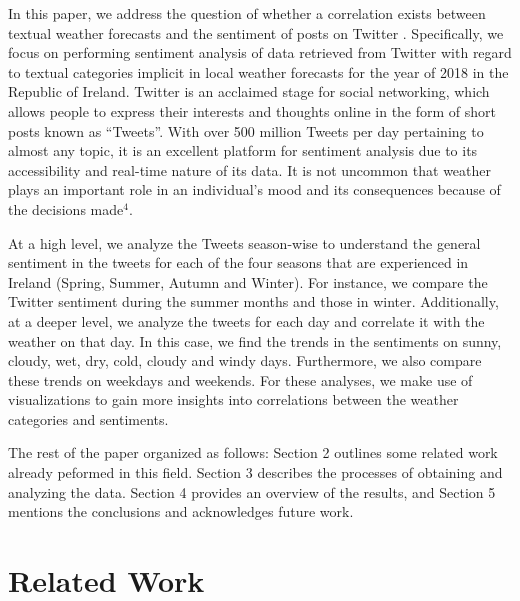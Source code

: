\documentclass[a4paper,10pt]{article}
\begin{document}
    
    In this paper, we address the question of whether a correlation exists between textual weather forecasts and the sentiment of posts on Twitter . Specifically, we focus on performing sentiment analysis of data retrieved from Twitter with regard to textual categories implicit in local weather forecasts for the year of 2018 in the Republic of Ireland. 
    Twitter is an acclaimed stage for social networking, which allows people to express their interests and thoughts online in the form of short posts known as “Tweets”. With over 500 million Tweets per day pertaining to almost any topic, it is an excellent platform for sentiment analysis due to its accessibility and real-time nature of its data. It is not uncommon that weather plays an important role in an individual’s mood and its consequences because of the decisions made$^4$.
    
    At a high level, we analyze the Tweets season-wise to understand the general sentiment in the tweets for each of the four seasons that are experienced in Ireland (Spring, Summer, Autumn and Winter). For instance, we compare the Twitter sentiment during the summer months and those in winter. Additionally, at a deeper level, we analyze the tweets for each day and correlate it with the weather on that day. In this case, we find the trends in the sentiments on sunny, cloudy, wet, dry, cold, cloudy and windy days. Furthermore, we also compare these trends on weekdays and weekends. For these analyses, we make use of visualizations to gain more insights into correlations between the weather categories and sentiments.

    The rest of the paper organized as follows: Section 2 outlines some related work already peformed in this field. Section 3 describes the processes of obtaining and analyzing the data. Section 4 provides an overview of the results, and Section 5 mentions the conclusions and acknowledges future work.
   
   \section{Related Work}
    \label{related_work}
\end{document}
